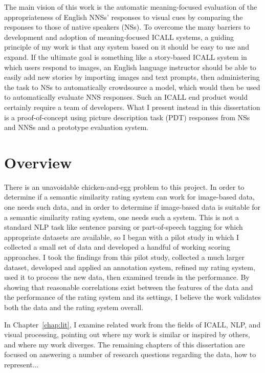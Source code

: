 The main vision of this work is the automatic meaning-focused evaluation of the appropriateness of English NNSs' responses to visual cues by comparing the responses to those of native speakers (NSs).
To overcome the many barriers to development and adoption of meaning-focused ICALL systems, a guiding principle of my work is that any system based on it should be easy to use and expand. If the ultimate goal is something like a story-based ICALL system in which users respond to images, an English language instructor should be able to easily add new stories by importing images and text prompts, then administering the task to NSs to automatically crowdsource a model, which would then be used to automatically evaluate NNS responses. Such an ICALL end product would certainly require a team of developers. What I present instead in this dissertation is a proof-of-concept using picture description task (PDT) responses from NSs and NNSs and a prototype evaluation system.

\section{Overview}
\label{sec:overview}



There is an unavoidable chicken-and-egg problem to this project. In order to determine if a semantic similarity rating system can work for image-based data, one needs such data, and in order to determine if image-based data is suitable for a semantic similarity rating system, one needs such a system. This is not a standard NLP task like sentence parsing or part-of-speech tagging for which appropriate datasets are available, so I began with a pilot study in which I collected a small set of data and developed a handful of working scoring approaches. I took the findings from this pilot study, collected a much larger dataset, developed and applied an annotation system, refined my rating system, used it to process the new data, then examined trends in the performance. By showing that reasonable correlations exist between the features of the data and the performance of the rating system and its settings, I believe the work validates both the data and the rating system overall.

In Chapter~\ref{chap:lit}, I examine related work from the fields of ICALL, NLP, and visual processing, pointing out where my work is similar or inspired by others, and where my work diverges. The remaining chapters of this dissertation are focused on answering a number of research questions regarding the data, how to represent...


